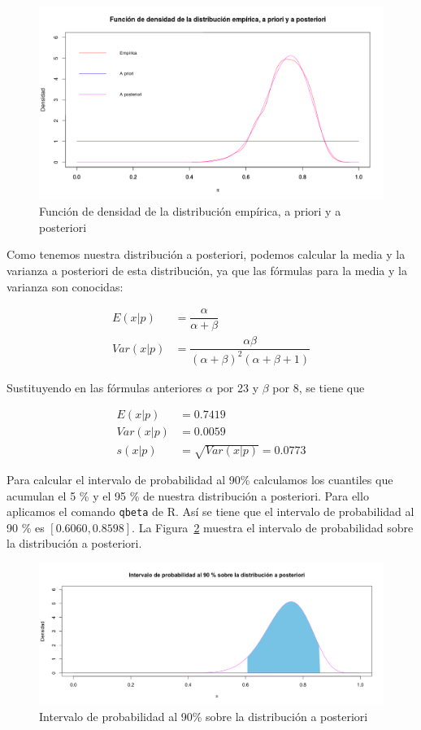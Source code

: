 \documentclass[12pt,a4paper,twoside,openright,titlepage,final]{article}
\begin{document}
\begin{figure}[tbph!]
\centering
\includegraphics[width=0.9\linewidth]{./imagenes/distribuciones_beta}
\caption{Función de densidad de la distribución empírica, a priori y a posteriori}
\label{fig:distribuciones_beta}
\end{figure}

Como tenemos nuestra distribución a posteriori, podemos calcular la media y la varianza a posteriori de esta distribución, ya que las fórmulas para la media y la varianza son conocidas:

\begin{align*}
E(x|p) & = \dfrac{\alpha}{\alpha + \beta}\\
Var(x|p) & = \dfrac{\alpha \beta}{(\alpha + \beta)^2 (\alpha + \beta + 1)}
\end{align*}

Sustituyendo en las fórmulas anteriores $\alpha$ por 23 y $\beta$ por 8, se tiene que

\begin{align*}
E(x|p) & = 0.7419 \\
Var(x|p) & = 0.0059 \\
s(x|p) & = \sqrt{Var(x|p)} = 0.0773 
\end{align*}

Para calcular el intervalo de probabilidad al 90\% calculamos los cuantiles que acumulan el 5 \% y el 95 \% de nuestra distribución a posteriori. Para ello aplicamos el comando \texttt{qbeta} de R. Así se tiene que el intervalo de probabilidad al 90 \% es $[0.6060, 0.8598]$. La Figura~\ref{fig:intervalo_probabilidad_beta} muestra el intervalo de probabilidad sobre la distribución a posteriori. 

\begin{figure}[tbph!]
\centering
\includegraphics[width=0.9\linewidth]{./imagenes/intervalo_probabilidad_beta}
\caption{Intervalo de probabilidad al 90\% sobre la distribución a posteriori}
\label{fig:intervalo_probabilidad_beta}
\end{figure}
\end{document}
